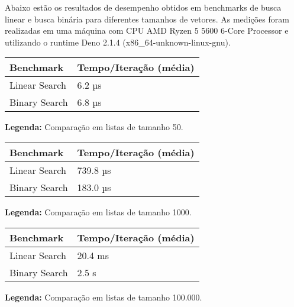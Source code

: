 Abaixo estão os resultados de desempenho obtidos em benchmarks de busca linear e 
busca binária para diferentes tamanhos de vetores. As medições foram realizadas 
em uma máquina com CPU AMD Ryzen 5 5600 6-Core Processor e utilizando o runtime 
Deno 2.1.4 (x86\_64-unknown-linux-gnu).

\vspace{5mm}

\begin{tabular}{|l|l|}
\hline
\textbf{Benchmark} & \textbf{Tempo/Iteração (média)} \\
\hline
Linear Search & 6.2 µs \\
Binary Search & 6.8 µs \\
\hline
\end{tabular}

\vspace{1mm}

\textbf{Legenda:} Comparação em listas de tamanho 50.

\vspace{5mm}

\begin{tabular}{|l|l|}
\hline
\textbf{Benchmark} & \textbf{Tempo/Iteração (média)} \\
\hline
Linear Search & 739.8 µs \\
Binary Search & 183.0 µs \\
\hline
\end{tabular}

\textbf{Legenda:} Comparação em listas de tamanho 1000.

\vspace{5mm}

\begin{tabular}{|l|l|}
\hline
\textbf{Benchmark} & \textbf{Tempo/Iteração (média)} \\
\hline
Linear Search & 20.4 ms \\
Binary Search & 2.5 s \\
\hline
\end{tabular}

\textbf{Legenda:} Comparação em listas de tamanho 100.000.

\vspace{5mm}
